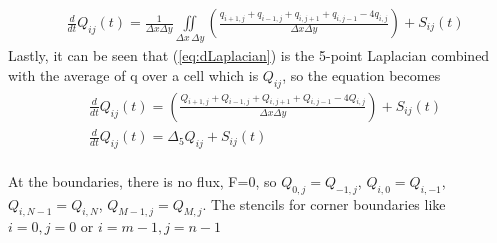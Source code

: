 \begin{enumerate}
	\begin{align}
		& \frac{d}{dt} Q_{ij}(t) = \frac{1}{\Delta x \Delta y} \iint \limits_{\Delta x \, \Delta y} \left( \frac{ q_{i+1,j} +q_{i-1,j} +q_{i,j+1} + q_{i,j-1} -4q_{i,j} }{\Delta x \Delta y} \right) + S_{ij}(t) \label{eq:dLaplacian} 
	\end{align}
	Lastly, it can be seen that (\ref{eq:dLaplacian}) is the 5-point Laplacian combined with the average of q over a cell which is $Q_{ij}$, so the equation becomes 
	\begin{align*}
		& \frac{d}{dt} Q_{ij}(t) = \left( \frac{ Q_{i+1,j} +Q_{i-1,j} +Q_{i,j+1} + Q_{i,j-1} -4Q_{i,j} }{\Delta x \Delta y} \right) + S_{ij}(t) \\
		& \frac{d}{dt} Q_{ij}(t) = \Delta_5 Q_{ij} + S_{ij}(t) 
	\end{align*}
	\\
	At the boundaries, there is no flux, F=0, so $Q_{0,j}=Q_{-1,j}$, $Q_{i,0}=Q_{i,-1}$, $Q_{i,N-1}=Q_{i,N}$, $Q_{M-1,j}=Q_{M,j}$. The stencils for corner boundaries like $i=0,j=0$ or $i=m-1,j=n-1$
	

\end{enumerate}
